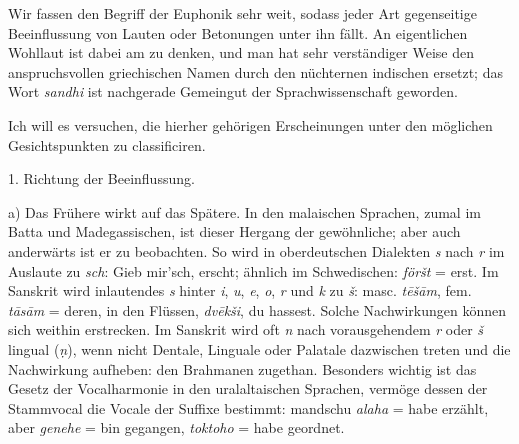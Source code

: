 {Wir fassen den Begriff der Euphonik sehr weit, sodass jeder Art gegenseitige Beeinflussung von Lauten oder Betonungen unter ihn fällt. An eigentlichen Wohllaut ist dabei am  zu denken, und man \label{fp.205} hat sehr verständiger Weise den anspruchsvollen griechischen Namen durch den nüchternen indischen ersetzt; das Wort \textit{sandhi} ist nachgerade Gemeingut der Sprachwissenschaft geworden.

 Ich will es versuchen, die hierher gehörigen Erscheinungen unter den  möglichen Gesichtspunkten zu classificiren.

1. Richtung der Beeinflussung.

a) Das Frühere wirkt auf das Spätere. In den malaischen Sprachen, zumal im Batta und Madegassischen, ist dieser Hergang der gewöhnliche; aber auch anderwärts ist er zu beobachten. So wird in oberdeutschen Dialekten \textit{s} nach \textit{r} im Auslaute zu \textit{sch}: Gieb mir’sch, erscht; ähnlich im Schwedischen: \textit{föršt} = erst. Im Sanskrit wird inlautendes \textit{s} hinter \textit{i}, \textit{u}, \textit{e}, \textit{o}, \textit{r} und \textit{k} zu \textit{š}: masc. \textit{tēšām}, fem. \textit{tāsām} = deren,  in den Flüssen, \textit{dvēkši}, du hassest. Solche Nach\label{sp.199}wirkungen können sich weithin erstrecken. Im Sanskrit wird oft \textit{n} nach vorausgehendem \textit{r} oder \textit{š} lingual (\textit{ṇ}), wenn nicht Dentale, Linguale oder Palatale dazwischen treten und die Nachwirkung aufheben:  den Brahmanen zugethan. Besonders wichtig ist das Gesetz der Vocalharmonie in den uralaltaischen Sprachen, vermöge dessen der Stammvocal die Vocale der Suffixe bestimmt: mandschu \textit{alaha} = habe erzählt, aber \textit{genehe} = bin gegangen, \textit{toktoho} = habe geordnet. 

}
